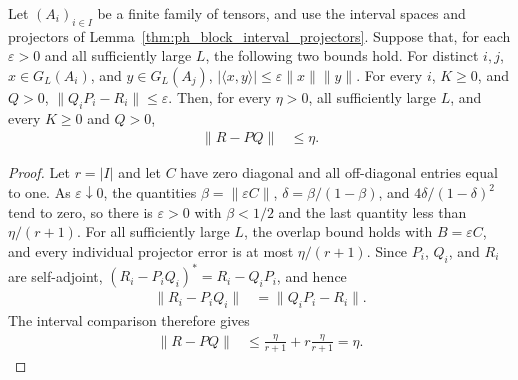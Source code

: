 \begin{lemma}
    \label{thm:ph_block_interval_defect_decay}
    \leanok
    Let $(A_i)_{i\in I}$ be a finite family of tensors, and use the interval
    spaces and projectors of Lemma~\ref{thm:ph_block_interval_projectors}.
    Suppose that, for each $\varepsilon>0$ and all sufficiently large $L$,
    the following two bounds hold. For distinct $i,j$, $x\in G_L(A_i)$,
    and $y\in G_L(A_j)$,
    $|\langle x,y\rangle|\leq\varepsilon\lVert x\rVert\lVert y\rVert$.
    For every $i$, $K\geq0$, and $Q>0$,
    $\lVert Q_iP_i-R_i\rVert\leq\varepsilon$.
    Then, for every $\eta>0$, all sufficiently large $L$, and every
    $K\geq0$ and $Q>0$,
    \begin{align}
        \lVert R-PQ\rVert & \leq\eta.
    \end{align}
\end{lemma}
\begin{proof}
    \leanok
    Let $r=|I|$ and let $C$ have zero diagonal and all off-diagonal entries
    equal to one. As $\varepsilon\downarrow0$, the quantities
    $\beta=\lVert\varepsilon C\rVert$, $\delta=\beta/(1-\beta)$, and
    $4\delta/(1-\delta)^2$ tend to zero, so there is $\varepsilon>0$ with
    $\beta<1/2$ and the last quantity less than $\eta/(r+1)$.
    For all sufficiently large $L$, the overlap bound holds with
    $B=\varepsilon C$, and every individual projector error is at most
    $\eta/(r+1)$. Since $P_i$, $Q_i$, and $R_i$ are self-adjoint,
    $(R_i-P_iQ_i)^*=R_i-Q_iP_i$, and hence
    \begin{align}
        \lVert R_i-P_iQ_i\rVert & =\lVert Q_iP_i-R_i\rVert.
    \end{align}
    The interval comparison therefore gives
    \begin{align}
        \lVert R-PQ\rVert
         & \leq\frac{\eta}{r+1}+r\frac{\eta}{r+1}=\eta.
    \end{align}
\end{proof}


